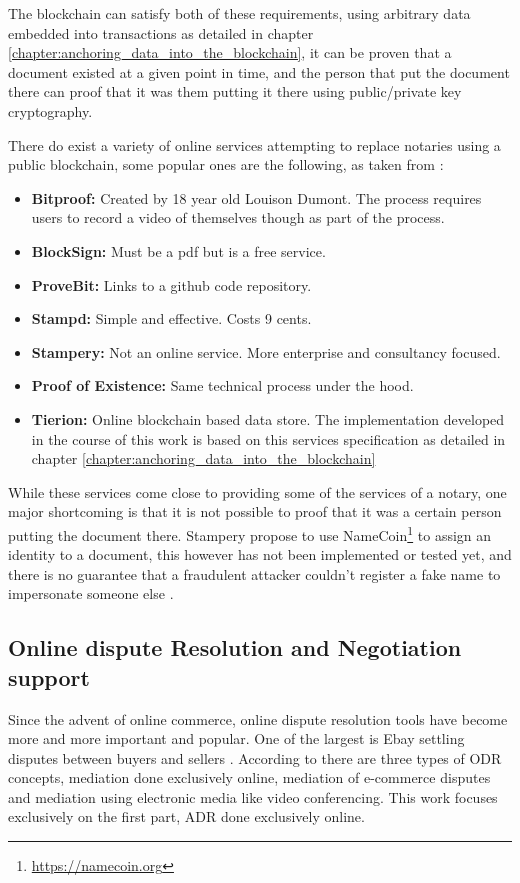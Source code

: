 \documentclass[12pt,msc,a4paper,oneside]{ucl_thesis}
\begin{document}
The blockchain can satisfy both of these requirements, using arbitrary data embedded into transactions as detailed in chapter \ref{chapter:anchoring_data_into_the_blockchain}, it can be proven that a document existed at a given point in time, and the person that put the document there can proof that it was them putting it there using public/private key cryptography.

There do exist a variety of online services attempting to replace notaries using a public blockchain, some popular ones are the following, as taken from \cite{notary:does_blockchain_notary_work}:

\begin{itemize}
    \item{\textbf{Bitproof:}} Created by 18 year old Louison Dumont. The process requires users to record a video of themselves though as part of the process.
    \item{\textbf{BlockSign:}} Must be a pdf but is a free service.
    \item{\textbf{ProveBit:}} Links to a github code repository.
    \item{\textbf{Stampd:}} Simple and effective. Costs 9 cents.
    \item{\textbf{Stampery:}} Not an online service. More enterprise and consultancy focused.
    \item{\textbf{Proof of Existence:}} Same technical process under the hood.     
    \item{\textbf{Tierion:}} Online blockchain based data store. The implementation developed in the course of this work is based on this services specification as detailed in chapter \ref{chapter:anchoring_data_into_the_blockchain}
\end{itemize}

While these services come close to providing some of the services of a notary, one major shortcoming is that it is not possible to proof that it was a certain person putting the document there. Stampery propose to use NameCoin\footnote{\url{https://namecoin.org}} to assign an identity to a document, this however has not been implemented or tested yet, and there is no guarantee that a fraudulent attacker couldn't register a fake name to impersonate someone else \cite{notary:does_blockchain_notary_work} \cite{notary:stampery_medium}.

\subsection{Online dispute Resolution and Negotiation support}
Since the advent of online commerce, online dispute resolution tools have become more and more important and popular. One of the largest is Ebay settling disputes between buyers and sellers \cite{deffains2005efficiency}. According to \cite{Lodder:ORD_system_design} there are three types of ODR concepts, mediation done exclusively online, mediation of e-commerce disputes and mediation using electronic media like video conferencing. This work focuses exclusively on the first part, ADR done exclusively online.
\end{document}
